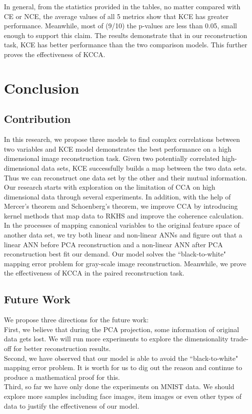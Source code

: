 \documentclass[12pt]{report} %
\begin{document}
In general, from the statistics provided in the tables, no matter compared with CE or NCE, the average values of all 5 metrics show that KCE has greater performance. Meanwhile, most of (9/10) the p-values are less than 0.05, small enough to support this claim. The results demonstrate that in our reconstruction task, KCE has better performance than the two comparison models. This further proves the effectiveness of KCCA. 

\chapter{Conclusion}
\section{Contribution}
In this research, we propose three models to find complex correlations between two variables and KCE model demonstrates the best performance on a high dimensional image reconstruction task. Given two potentially correlated high-dimensional data sets, KCE successfully builds a map between the two data sets. Thus we can reconstruct one data set by the other and their mutual information. Our research starts with exploration on the limitation of CCA on high dimensional data through several experiments. In addition, with the help of Mercer's theorem and Schoenberg's theorem, we improve CCA by introducing kernel methods that map data to RKHS and improve the coherence calculation. In the processes of mapping canonical variables to the original feature space of another data set, we try both linear and non-linear ANNs and figure out that a linear ANN before PCA reconstruction and a non-linear ANN after PCA reconstruction best fit our demand. Our model solves the ``black-to-white" mapping error problem for gray-scale image reconstruction. Meanwhile, we prove the effectiveness of KCCA in the paired reconstruction task.

\section{Future Work}
We propose three directions for the future work:\\
First, we believe that during the PCA projection, some information of original data gets lost. We will run more experiments to explore the dimensionality trade-off for better reconstruction results.\\
Second, we have observed that our model is able to avoid the ``black-to-white" mapping error problem. It is worth for us to dig out the reason and continue to produce a mathematical proof for this.\\
Third, so far we have only done the experiments on MNIST data. We should explore more samples including face images, item images or even other types of data to justify the effectiveness of our model.
\end{document}
